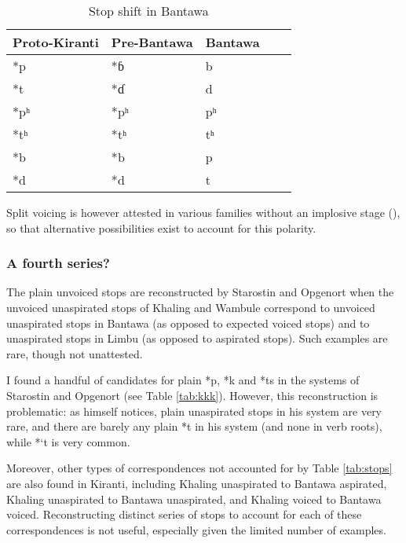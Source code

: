 \documentclass[oneside,a4paper,11pt]{article}
\newcommand{\ipa}[1]{{\phon\mbox{#1}}} %
\begin{document}
 

\begin{table}[H]
\caption{Stop shift in Bantawa} \centering \label{tab:bantawa}
\begin{tabular}{lllll}
\toprule
Proto-Kiranti &  Pre-Bantawa &   Bantawa \\
\midrule
\ipa{*p} & *\ipa{ɓ} & \ipa{b} \\
\ipa{*t} & *\ipa{ɗ} & \ipa{d} \\
\ipa{*pʰ} & *\ipa{pʰ} &  \ipa{pʰ} \\
\ipa{*tʰ} & *\ipa{tʰ} & \ipa{tʰ} \\
\ipa{*b} & *\ipa{b} &  \ipa{p} \\
\ipa{*d} & *\ipa{d} & \ipa{t} \\
\bottomrule
\end{tabular}
\end{table}
 
 Split voicing is however attested in various families without an implosive stage (\citealt[49-51]{kuemmel07wandel}), so that alternative possibilities exist to account for this polarity.
 

\subsubsection{A fourth series?} \label{sec:fourth}
The plain unvoiced stops are reconstructed by Starostin and Opgenort  when the unvoiced unaspirated stops of Khaling and Wambule correspond to unvoiced unaspirated stops in Bantawa (as opposed to expected voiced stops) and to unaspirated stops in Limbu (as opposed to aspirated stops). Such examples are rare, though not unattested. 

I found a handful of candidates for plain *\ipa{p}, *\ipa{k} and \ipa{*ts} in the systems of Starostin and Opgenort (see Table \ref{tab:kkk}). However, this reconstruction is problematic: as \citet[17]{opgenort05jero} himself notices, plain unaspirated stops in his system are very rare, and there are barely any plain *\ipa{t} in his system (and none in verb roots), while *\ipa{`t} is very common.  

Moreover, other types of correspondences not accounted for by Table \ref{tab:stops} are also found in Kiranti, including Khaling  unaspirated to Bantawa aspirated, Khaling unaspirated to Bantawa unaspirated, and Khaling voiced to Bantawa voiced. Reconstructing distinct series of stops to account for each of these correspondences is not useful, especially given the limited number of examples. 
\end{document}
